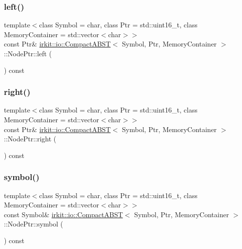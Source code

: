 \subsubsection{\texorpdfstring{left()}{left()}}
{\footnotesize\ttfamily template$<$class Symbol = char, class Ptr = std\+::uint16\+\_\+t, class Memory\+Container = std\+::vector$<$char$>$$>$ \\
const Ptr\& \mbox{\hyperlink{classirkit_1_1io_1_1CompactABST}{irkit\+::io\+::\+Compact\+A\+B\+ST}}$<$ Symbol, Ptr, Memory\+Container $>$\+::Node\+Ptr\+::left (\begin{DoxyParamCaption}{ }\end{DoxyParamCaption}) const\hspace{0.3cm}{\ttfamily [inline]}}

\mbox{\label{structirkit_1_1io_1_1CompactABST_1_1NodePtr_ab3cc9218c2c86b79504ab2db97d27914}} 
\subsubsection{\texorpdfstring{right()}{right()}}
{\footnotesize\ttfamily template$<$class Symbol = char, class Ptr = std\+::uint16\+\_\+t, class Memory\+Container = std\+::vector$<$char$>$$>$ \\
const Ptr\& \mbox{\hyperlink{classirkit_1_1io_1_1CompactABST}{irkit\+::io\+::\+Compact\+A\+B\+ST}}$<$ Symbol, Ptr, Memory\+Container $>$\+::Node\+Ptr\+::right (\begin{DoxyParamCaption}{ }\end{DoxyParamCaption}) const\hspace{0.3cm}{\ttfamily [inline]}}

\mbox{\label{structirkit_1_1io_1_1CompactABST_1_1NodePtr_a5e558b7c92168f58a0f2e16b64c5ad9d}} 
\subsubsection{\texorpdfstring{symbol()}{symbol()}}
{\footnotesize\ttfamily template$<$class Symbol = char, class Ptr = std\+::uint16\+\_\+t, class Memory\+Container = std\+::vector$<$char$>$$>$ \\
const Symbol\& \mbox{\hyperlink{classirkit_1_1io_1_1CompactABST}{irkit\+::io\+::\+Compact\+A\+B\+ST}}$<$ Symbol, Ptr, Memory\+Container $>$\+::Node\+Ptr\+::symbol (\begin{DoxyParamCaption}{ }\end{DoxyParamCaption}) const\hspace{0.3cm}{\ttfamily [inline]}}



